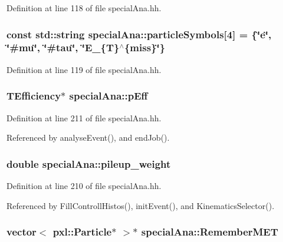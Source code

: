 Definition at line 118 of file special\-Ana.\-hh.

\subsubsection[{particle\-Symbols}]{\setlength{\rightskip}{0pt plus 5cm}const std\-::string special\-Ana\-::particle\-Symbols\mbox{[}4\mbox{]} = \{\char`\"{}e\char`\"{}, \char`\"{}\#mu\char`\"{}, \char`\"{}\#tau\char`\"{}, \char`\"{}E\-\_\-\{T\}$^\wedge$\{miss\}\char`\"{}\}}\label{classspecialAna_a5500b6ed6706afbab4721747b9a475c8}


Definition at line 119 of file special\-Ana.\-hh.

\subsubsection[{p\-Eff}]{\setlength{\rightskip}{0pt plus 5cm}T\-Efficiency$\ast$ special\-Ana\-::p\-Eff}\label{classspecialAna_a1271615b07b243df0bd09c1c612258af}


Definition at line 211 of file special\-Ana.\-hh.



Referenced by analyse\-Event(), and end\-Job().

\subsubsection[{pileup\-\_\-weight}]{\setlength{\rightskip}{0pt plus 5cm}double special\-Ana\-::pileup\-\_\-weight}\label{classspecialAna_a2b5b5144746c7a945308b1700a0b0a10}


Definition at line 210 of file special\-Ana.\-hh.



Referenced by Fill\-Controll\-Histos(), init\-Event(), and Kinematics\-Selector().

\subsubsection[{Remember\-M\-E\-T}]{\setlength{\rightskip}{0pt plus 5cm}vector$<$ pxl\-::\-Particle$\ast$ $>$$\ast$ special\-Ana\-::\-Remember\-M\-E\-T}\label{classspecialAna_a3da2afad197768ff70017d2439a4ecbb}


